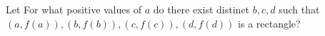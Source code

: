 Let   For what positive values of $a$ do there exist distinct $b,c,d$ such that $(a,f(a)),(b,f(b)),(c,f(c)),(d,f(d))$ is a rectangle?